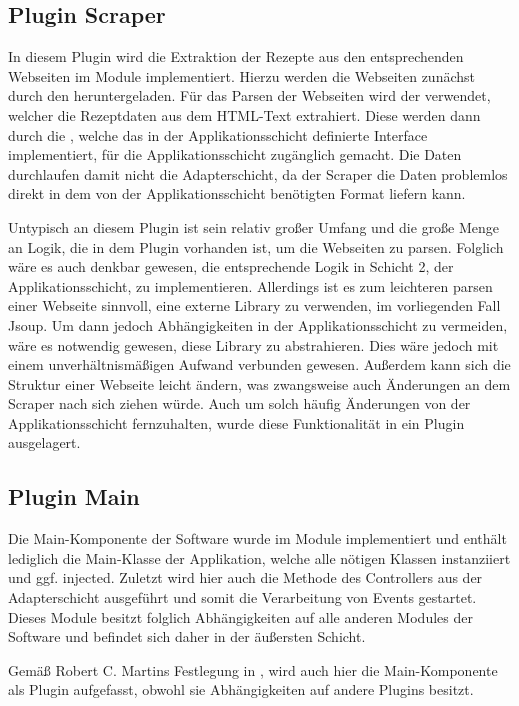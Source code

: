 \subsection{Plugin Scraper}
In diesem Plugin wird die Extraktion der Rezepte aus den entsprechenden Webseiten im Module  implementiert. Hierzu werden die Webseiten zunächst durch den  heruntergeladen. Für das Parsen der Webseiten wird der  verwendet, welcher die Rezeptdaten aus dem HTML-Text extrahiert. Diese werden dann durch die , welche das in der Applikationsschicht definierte Interface  implementiert, für die Applikationsschicht zugänglich gemacht. Die Daten durchlaufen damit nicht die Adapterschicht, da der Scraper die Daten problemlos direkt in dem von der Applikationsschicht benötigten Format liefern kann.

Untypisch an diesem Plugin ist sein relativ großer Umfang und die große Menge an Logik, die in dem Plugin vorhanden ist, um die Webseiten zu parsen. Folglich wäre es auch denkbar gewesen, die entsprechende Logik in Schicht 2, der Applikationsschicht, zu implementieren. Allerdings ist es zum leichteren parsen einer Webseite sinnvoll, eine externe Library zu verwenden, im vorliegenden Fall Jsoup. Um dann jedoch Abhängigkeiten in der Applikationsschicht zu vermeiden, wäre es notwendig gewesen, diese Library zu abstrahieren. Dies wäre jedoch mit einem unverhältnismäßigen Aufwand verbunden gewesen. Außerdem kann sich die Struktur einer Webseite leicht ändern, was zwangsweise auch Änderungen an dem Scraper nach sich ziehen würde. Auch um solch häufig Änderungen von der Applikationsschicht fernzuhalten, wurde diese Funktionalität in ein Plugin ausgelagert. 

\subsection{Plugin Main}
Die Main-Komponente der Software wurde im Module  implementiert und enthält lediglich die Main-Klasse der Applikation, welche alle nötigen Klassen instanziiert und ggf. injected. Zuletzt wird hier auch die Methode  des Controllers aus der Adapterschicht ausgeführt und somit die Verarbeitung von Events gestartet. Dieses Module besitzt folglich Abhängigkeiten auf alle anderen Modules der Software und befindet sich daher in der äußersten Schicht.

Gemäß Robert C. Martins Festlegung in \cite{Martin.2018}, wird auch hier die Main-Komponente als Plugin aufgefasst, obwohl sie Abhängigkeiten auf andere Plugins besitzt.
